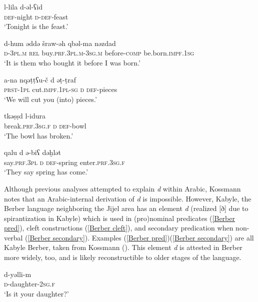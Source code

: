 \documentclass[output=paper]{langsci/langscibook}
\begin{document}
\ea\label{nonverbal}

\gll l-lila  d-ǝl-ʕid\\
     \textsc{def}-night  \textsc{d}-\textsc{def}-feast\\
\glt ‘Tonight is the feast.’
\z

\ea\label{clefts}

\gll d-hum  ǝddǝ  šraw-ǝh   qbǝl-ma  nǝzdad\\
     \textsc{d}-\textsc{3pl.m} \textsc{rel}  buy.\textsc{prf.3pl.m}-\textsc{3sg.m}  before-\textsc{comp} be.born.\textsc{impf.1sg}\\
\glt ‘It is them who bought it before I was born.’
\z

\ea\label{secondary pred}

\gll {\R}a-na  nqǝṭṭʕu-č  d  ǝṭ-ṭraf\\
     \textsc{prst}-\textsc{1pl}  cut.\textsc{impf.1pl-sg}  \textsc{d}  \textsc{def}-pieces\\
\glt ‘We will cut you (into) pieces.’
\z

\ea\label{focus}

\gll tkǝṣṣ  d  l-idura\\
     break.\textsc{prf.3sg.f}  \textsc{d}  \textsc{def}-bowl\\
\glt ‘The bowl has broken.’
\z

\ea\label{left focalizations}

\gll qalu  d  ǝ\R-{\R}biʕ  dǝḫlǝt\\
     say.\textsc{prf.3pl}  \textsc{d}  \textsc{def}-spring  enter.\textsc{prf.3sg.f}\\
\glt ‘They say spring has come.’
\z

Although previous analyses attempted to explain \textit{d} within Arabic, Kossmann notes that an Arabic-internal derivation of \textit{d} is impossible. However, Kabyle, the Berber language neighboring the Jijel area has an element \textit{d} (realized [ð] due to spirantization in Kabyle) which is used in (pro)nominal predicates (\ref{Berber pred}), cleft constructions (\ref{Berber cleft}), and secondary predication when non-verbal (\ref{Berber secondary}). Examples (\ref{Berber pred})\textendash(\ref{Berber secondary}) are all Kabyle Berber, taken from Kossmann (\citeyear[135]{Kossmann2014}). This element \textit{d} is attested in Berber more widely, too, and is likely reconstructible to older stages of the language.

\ea\label{Berber pred}


\gll d-yǝlli-m\\
     \textsc{d}-daughter-\textsc{2sg.f}\\
\glt ‘Is it your daughter?’
\z
\end{document}
